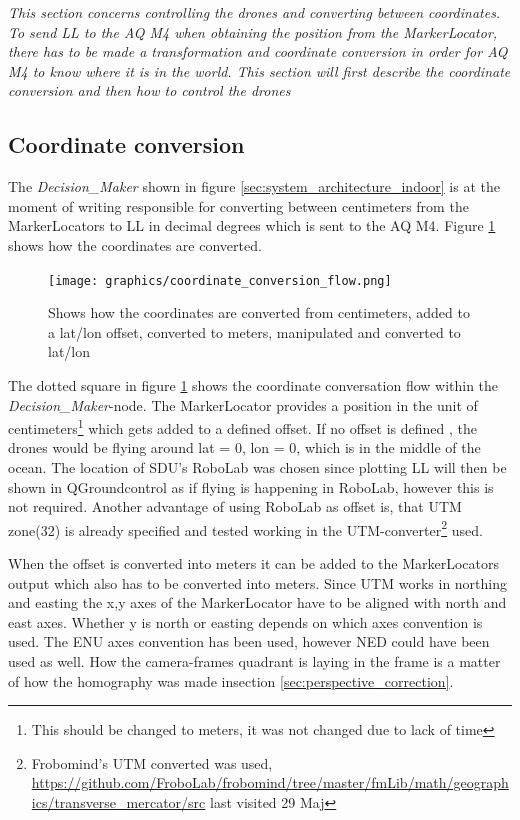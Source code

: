 \textit{This section concerns controlling the drones and converting between coordinates. To send \ac{LL} to the \ac{AQ} M4 when obtaining the position from the MarkerLocator, there has to be made a transformation and coordinate conversion in order for \ac{AQ} M4 to know where it is in the world. This section will first describe the coordinate conversion and then how to control the drones}

\subsection{Coordinate conversion}
The \textit{Decision\_Maker} shown in figure \ref{sec:system_architecture_indoor} is at the moment of writing responsible for converting between centimeters from the MarkerLocators to \ac{LL} in decimal degrees which is sent to the AQ M4. Figure \ref{fig:coordinate_flow} shows how the coordinates are converted.

\begin{figure}[H]
    \center
    \texttt{[image: graphics/coordinate\_conversion\_flow.png]}
  	\caption{Shows how the coordinates are converted from centimeters, added to a lat/lon offset, converted to meters, manipulated and converted to lat/lon}
    \label{fig:coordinate_flow}
\end{figure}

The dotted square in figure \ref{fig:coordinate_flow} shows the coordinate conversation flow within the \textit{Decision\_Maker}-node.
The MarkerLocator provides a position in the unit of centimeters\footnote{This should be changed to meters, it was not changed due to lack of time} which gets added to a defined offset.
If no offset is defined , the drones would be flying around lat = 0, lon = 0, which is in the middle of the ocean.
The location of SDU's RoboLab was chosen since plotting \ac{LL} will then be shown in QGroundcontrol as if flying is happening in RoboLab, however this is not required.
Another advantage of using RoboLab as offset is, that \ac{UTM} zone(32) is already specified and tested working in the \ac{UTM}-converter\footnote{Frobomind's UTM converted was used, \url{https://github.com/FroboLab/frobomind/tree/master/fmLib/math/geographics/transverse_mercator/src} last visited 29 Maj} used.

When the offset is converted into meters it can be added to the MarkerLocators output which also has to be converted into meters.
Since UTM works in northing and easting the x,y axes of the MarkerLocator have to be aligned with north and east axes. Whether y is north or easting  depends on which axes convention is used.
The \ac{ENU} axes convention has been used, however \ac{NED} could have been used as well.
How the camera-frames quadrant is laying in the frame is a matter of how the homography was made insection \ref{sec:perspective_correction}.

